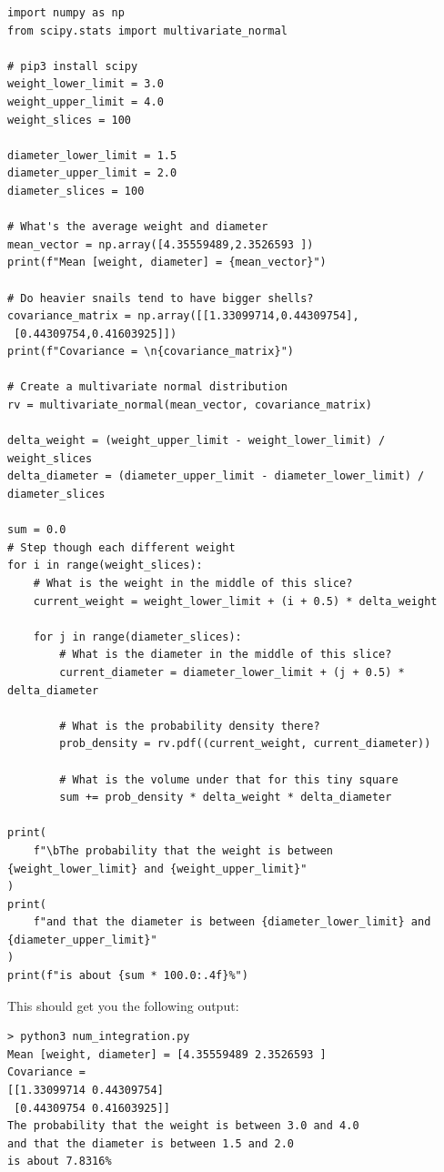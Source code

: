\begin{verbatim}
import numpy as np
from scipy.stats import multivariate_normal

# pip3 install scipy
weight_lower_limit = 3.0
weight_upper_limit = 4.0
weight_slices = 100

diameter_lower_limit = 1.5
diameter_upper_limit = 2.0
diameter_slices = 100

# What's the average weight and diameter
mean_vector = np.array([4.35559489,2.3526593 ])
print(f"Mean [weight, diameter] = {mean_vector}")

# Do heavier snails tend to have bigger shells?
covariance_matrix = np.array([[1.33099714,0.44309754],
 [0.44309754,0.41603925]])
print(f"Covariance = \n{covariance_matrix}")

# Create a multivariate normal distribution
rv = multivariate_normal(mean_vector, covariance_matrix)

delta_weight = (weight_upper_limit - weight_lower_limit) / weight_slices
delta_diameter = (diameter_upper_limit - diameter_lower_limit) / diameter_slices

sum = 0.0
# Step though each different weight
for i in range(weight_slices):
    # What is the weight in the middle of this slice?
    current_weight = weight_lower_limit + (i + 0.5) * delta_weight

    for j in range(diameter_slices):
        # What is the diameter in the middle of this slice?
        current_diameter = diameter_lower_limit + (j + 0.5) * delta_diameter

        # What is the probability density there?
        prob_density = rv.pdf((current_weight, current_diameter))

        # What is the volume under that for this tiny square
        sum += prob_density * delta_weight * delta_diameter

print(
    f"\bThe probability that the weight is between {weight_lower_limit} and {weight_upper_limit}"
)
print(
    f"and that the diameter is between {diameter_lower_limit} and {diameter_upper_limit}"
)
print(f"is about {sum * 100.0:.4f}%")
\end{verbatim}

This should get you the following output:

\begin{verbatim}
> python3 num_integration.py
Mean [weight, diameter] = [4.35559489 2.3526593 ]
Covariance =
[[1.33099714 0.44309754]
 [0.44309754 0.41603925]]
The probability that the weight is between 3.0 and 4.0
and that the diameter is between 1.5 and 2.0
is about 7.8316%
\end{verbatim}

